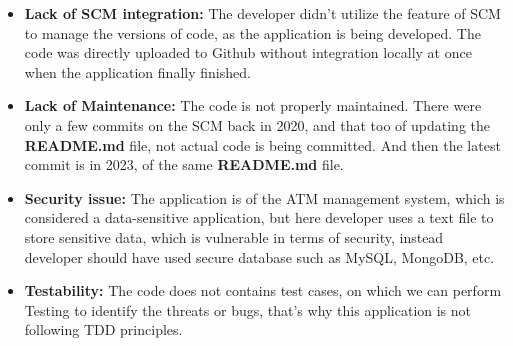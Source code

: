 \documentclass[12pt,letterpaper]{report}
\begin{document}
\begin{itemize}
    \item \textbf{Lack of SCM integration:} The developer didn't utilize the feature of SCM to manage the versions of code, as the application is being developed. The code was directly uploaded to Github without integration locally at once when the application finally finished.
    \item \textbf{Lack of Maintenance:} The code is not properly maintained. There were only a few commits on the SCM back in 2020, and that too of updating the \textbf{README.md} file, not actual code is being committed. And then the latest commit is in 2023, of the same \textbf{README.md} file.
    \item \textbf{Security issue: } The application is of the ATM management system, which is considered a data-sensitive application, but here developer uses a text file to store sensitive data, which is vulnerable in terms of security, instead developer should have used secure database such as MySQL, MongoDB, etc. 
   
    \item \textbf{Testability:} The code does not contains test cases, on which we can perform Testing to identify the threats or bugs, that's why this application is not following TDD principles.
\end{itemize}
\\
\pagebreak



\end{document}
